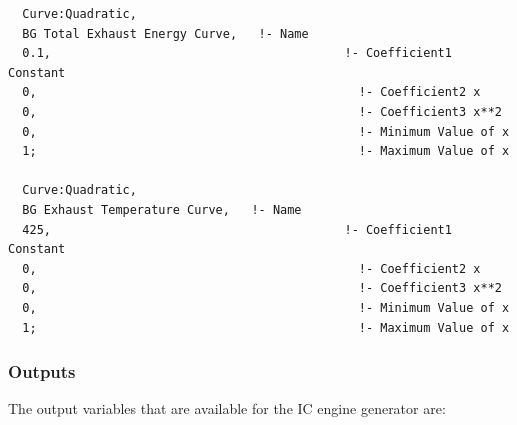\begin{lstlisting}
  Curve:Quadratic,
  BG Total Exhaust Energy Curve,   !- Name
  0.1,                                         !- Coefficient1 Constant
  0,                                             !- Coefficient2 x
  0,                                             !- Coefficient3 x**2
  0,                                             !- Minimum Value of x
  1;                                             !- Maximum Value of x

  Curve:Quadratic,
  BG Exhaust Temperature Curve,   !- Name
  425,                                         !- Coefficient1 Constant
  0,                                             !- Coefficient2 x
  0,                                             !- Coefficient3 x**2
  0,                                             !- Minimum Value of x
  1;                                             !- Maximum Value of x
\end{lstlisting}

\subsubsection{Outputs}\label{outputs-5-002}

The output variables that are available for the IC engine generator are:


